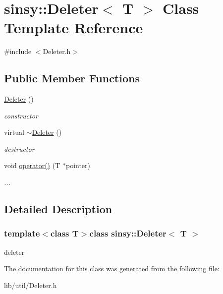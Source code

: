 \hypertarget{classsinsy_1_1Deleter}{\section{sinsy\-:\-:\-Deleter$<$ \-T $>$ \-Class \-Template \-Reference}
\label{classsinsy_1_1Deleter}
}


{\ttfamily \#include $<$\-Deleter.\-h$>$}

\subsection*{\-Public \-Member \-Functions}
\begin{DoxyCompactItemize}
\item 
\hypertarget{classsinsy_1_1Deleter_abac45b967afd9f06171d326db269b60e}{\hyperlink{classsinsy_1_1Deleter_abac45b967afd9f06171d326db269b60e}{\-Deleter} ()}\label{classsinsy_1_1Deleter_abac45b967afd9f06171d326db269b60e}

\begin{DoxyCompactList}\small\item\em constructor \end{DoxyCompactList}\item 
\hypertarget{classsinsy_1_1Deleter_a88dd86effe16835507c2976ac8f7395e}{virtual \hyperlink{classsinsy_1_1Deleter_a88dd86effe16835507c2976ac8f7395e}{$\sim$\-Deleter} ()}\label{classsinsy_1_1Deleter_a88dd86effe16835507c2976ac8f7395e}

\begin{DoxyCompactList}\small\item\em destructor \end{DoxyCompactList}\item 
\hypertarget{classsinsy_1_1Deleter_aacfabd0bf43f568b6fe6269e87cf30be}{void \hyperlink{classsinsy_1_1Deleter_aacfabd0bf43f568b6fe6269e87cf30be}{operator()} (\-T $\ast$pointer)}\label{classsinsy_1_1Deleter_aacfabd0bf43f568b6fe6269e87cf30be}

\begin{DoxyCompactList}\small\item\em ... \end{DoxyCompactList}\end{DoxyCompactItemize}


\subsection{\-Detailed \-Description}
\subsubsection*{template$<$class T$>$class sinsy\-::\-Deleter$<$ T $>$}

deleter 

\-The documentation for this class was generated from the following file\-:\begin{DoxyCompactItemize}
\item 
lib/util/\-Deleter.\-h\end{DoxyCompactItemize}
